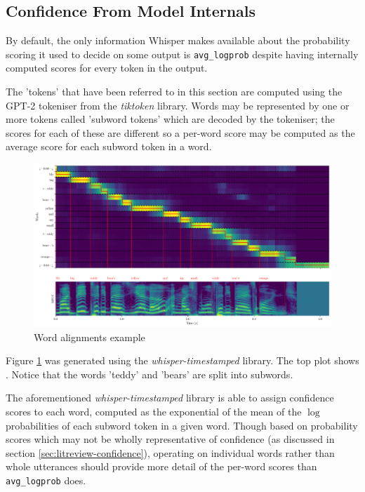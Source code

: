 \subsection{Confidence From Model Internals}

By default, the only information Whisper makes available about the probability scoring it used to decide on some output is \texttt{avg\_logprob} despite having internally computed scores for every token in the output.

The 'tokens' that have been referred to in this section are computed using the GPT-2 tokeniser from the \emph{tiktoken} library\cite{tiktoken}.
Words may be represented by one or more tokens called 'subword tokens' which are decoded by the tokeniser; the scores for each of these are different so a per-word score may be computed as the average score for each subword token in a word.

\begin{figure}[H]
  \centering
  \includegraphics[width=\textwidth]{images/mfcc-with-words.png}
  \caption{Word alignments example}
  \label{fig:word-alignments-example}
\end{figure}

Figure \ref{fig:word-alignments-example} was generated using the \emph{whisper-timestamped} library\cite{whisper-timestamped, whisper-ts-dtw-paper, whisper}.
The top plot shows \cite{whisper-timestamped}.
Notice that the words 'teddy' and 'bears' are split into subwords.

The aforementioned \emph{whisper-timestamped} library is able to assign confidence scores to each word, computed as the exponential of the mean of the $\log$ probabilities of each subword token in a given word.
Though based on probability scores which may not be wholly representative of confidence (as discussed in section \ref{sec:litreview-confidence}), operating on individual words rather than whole utterances should provide more detail of the per-word scores than \texttt{avg\_logprob} does.

